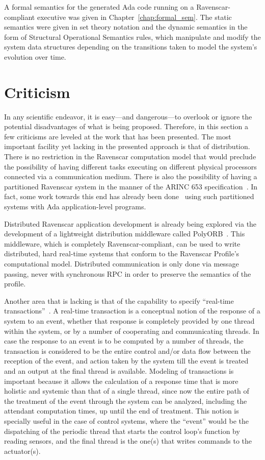 A formal semantics for the generated Ada code running on a
Ravenscar-compliant executive was given in
Chapter~\ref{chap:formal_sem}. The static semantics were given in set
theory notation and the dynamic semantics in the form of Structural
Operational Semantics rules, which manipulate and modify the system
data structures depending on the transitions taken to model the
system's evolution over time.

\section{Criticism}
In any scientific endeavor, it is easy---and dangerous---to overlook
or ignore the potential disadvantages of what is being
proposed. Therefore, in this section a few criticisms are leveled at
the work that has been presented. The most important facility yet
lacking in the presented approach is that of distribution. There is no
restriction in the Ravenscar computation model that would preclude the
possibility of having different tasks executing on different physical
processors connected via a communication medium. There is also the
possibility of having a partitioned Ravenscar system in the manner of
the ARINC 653 specification~\cite{arinc}. In fact, some work towards
this end has already been done~\cite{tokar@adalett03} using such
partitioned systems with Ada application-level programs.

Distributed Ravenscar application development is already being
explored via the development of a lightweight distribution middleware
called PolyORB~\cite{zalila@ae07}. This middleware, which is
completely Ravenscar-compliant, can be used to write distributed, hard
real-time systems that conform to the Ravenscar Profile's
computational model. Distributed communication is only done via
message passing, never with synchronous RPC in order to preserve the
semantics of the profile.

Another area that is lacking is that of the capability to specify
``real-time transactions''~\cite{cornwell@ae96}. A real-time
transaction is a conceptual notion of the response of a system to an
event, whether that response is completely provided by one thread
within the system, or by a number of cooperating and communicating
threads. In case the response to an event is to be computed by a
number of threads, the transaction is considered to be the entire
control and/or data flow between the reception of the event, and
action taken by the system till the event is treated and an output at
the final thread is available. Modeling of transactions is important
because it allows the calculation of a response time that is more
holistic and systemic than that of a single thread, since now the
entire path of the treatment of the event through the system can be
analyzed, including the attendant computation times, up until the end
of treatment. This notion is specially useful in the case of control
systems, where the ``event'' would be the dispatching of the periodic
thread that starts the control loop's function by reading sensors, and
the final thread is the one(s) that writes commands to the
actuator(s).

